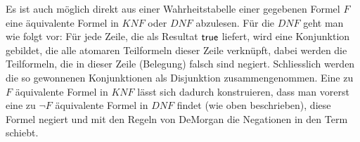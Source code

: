 \begin{rk}
    Es ist auch möglich direkt aus einer Wahrheitstabelle einer gegebenen Formel $F$ eine äquivalente Formel in $KNF$ oder $DNF$ abzulesen. Für die $DNF$ geht man wie folgt vor: Für jede Zeile, die als Resultat $\mathsf{true}$ liefert, wird eine Konjunktion gebildet, die alle atomaren Teilformeln dieser Zeile verknüpft, dabei werden die Teilformeln, die in dieser Zeile (Belegung) falsch sind negiert. Schliesslich werden die so gewonnenen Konjunktionen als Disjunktion zusammengenommen. Eine zu $F$ äquivalente Formel in $KNF$ lässt sich dadurch konstruieren, dass man vorerst eine zu $\neg F$ äquivalente Formel in $DNF$ findet (wie oben beschrieben), diese Formel negiert und mit den Regeln von DeMorgan die Negationen in den Term schiebt.
\end{rk}


